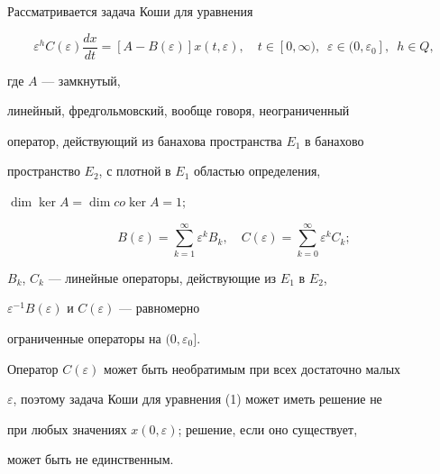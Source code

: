 

\maketitle


\label{begin}





Рассматривается задача Коши для уравнения


\begin{equation}


\varepsilon^hC(\varepsilon)\frac{dx}{dt}=[A-B(\varepsilon)]x(t,


\varepsilon),\quad


t \in [0,\infty),\ \; \varepsilon \in


(0,\varepsilon_0], \ \; h \in Q,


\end{equation}


где $A$ --- замкнутый,


линейный, фредгольмовский, вообще говоря, неограниченный


оператор, действующий из банахова пространства $E_1$ в банахово


пространство $E_2$, с плотной в $E_1$ областью определения,


$\dim \ker A = \dim co\ker A = 1;$


$$


B(\varepsilon)=\sum_{k=1}^\infty\varepsilon^k B_k, \quad


C(\varepsilon)=\sum_{k=0}^\infty\varepsilon^kC_k ;


$$


$B_k$, $C_k$ --- линейные операторы, действующие из $E_1$ в $E_2$,


$\varepsilon^{-1}B(\varepsilon)$ и  $C(\varepsilon)$ --- равномерно


ограниченные операторы на $(0,\varepsilon_0]$.





Оператор $C(\varepsilon)$ может быть необратимым при всех достаточно малых


$\varepsilon$, поэтому задача Коши для уравнения (1) может иметь решение не


при любых значениях $x(0,\varepsilon)$; решение, если оно существует,


может быть не единственным.





